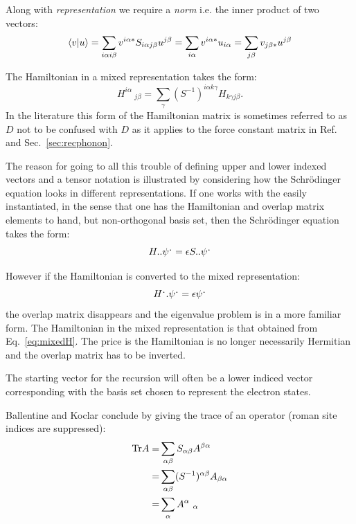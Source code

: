 Along with {\it representation} we require a {\it norm} i.e. 
the inner product of two vectors:
%
\begin{equation}
\langle v|u \rangle = \sum_{i\alpha i\beta}v^{i\alpha *}S_{i\alpha j\beta}u^{j\beta} = \sum_{i\alpha}v^{i\alpha *}u_{i\alpha} 
= \sum_{j\beta}v_{j\beta *}u^{j\beta}
\end{equation}
%

The Hamiltonian in a mixed representation takes the form:
%
\begin{equation}
\label{eq:mixedH}
H^{i\alpha}\ _{j\beta} = \sum_{\gamma}(S^{-1})^{i\alpha k\gamma}H_{k\gamma j\beta}.
\end{equation}
%
In the literature this form of the Hamiltonian matrix is sometimes referred to as $D$ 
not to be confused with $D$ as it applies to the force constant matrix in Ref.~\cite{weeks73}
and Sec.~\ref{sec:recphonon}.

The reason for going to all this trouble of defining upper and lower
indexed vectors and a tensor notation is illustrated by considering how the Schr\"odinger
equation looks in different representations. If one works with
the easily instantiated, in the sense that one has the Hamiltonian and
overlap matrix elements to hand, but non-orthogonal basis set, then the Schr\"odinger
equation takes the form:
%
\begin{equation}
H..\psi^{\mbox{\large .}}=\epsilon S..\psi^{\mbox{\large .}}
\end{equation}
%

However if the Hamiltonian is converted to the mixed representation:
%
\begin{equation}
H^{\mbox{\large .}}.\psi^{\mbox{\large .}}=\epsilon\psi^{\mbox{\large .}}
\end{equation}
%
the overlap matrix disappears and the eigenvalue problem is in a 
more familiar form. The Hamiltonian in the mixed representation 
is that obtained from Eq.~\ref{eq:mixedH}. The price is the Hamiltonian
is no longer necessarily Hermitian and the overlap matrix has to be inverted.

The starting vector for the recursion will often be a lower indiced
vector corresponding with the basis set chosen to represent the electron
states.

Ballentine and Koclar conclude by giving the trace of an operator
(roman site indices are suppressed):
\begin{align}
{\rm Tr}A =& \sum_{\alpha\beta}S_{\alpha\beta}A^{\beta\alpha}\\
          =& \sum_{\alpha\beta}(S^{-1})^{\alpha\beta}A_{\beta\alpha} \\
          =& \sum_{\alpha}A^{\alpha}\ _{\alpha}
\end{align}

